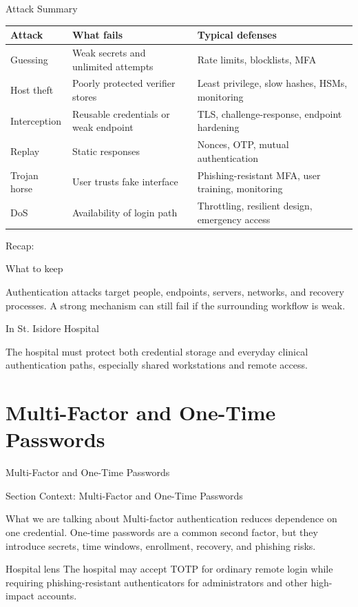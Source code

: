 \documentclass[presentation]{beamer}
\newcommand{\sectiontitleframe}[1]{
\begin{frame}[plain,c]
\begin{center}
{\usebeamerfont{title}\usebeamercolor[fg]{title}#1}
\end{center}
\end{frame}
}
\newcommand{\scenario}{St. Isidore Hospital}
\newcommand{\takeawaysframe}[2]{
  \begin{frame}[c]{Recap: \insertsection}
    \begin{block}{What to keep}
      #1
    \end{block}
    \begin{exampleblock}{In \scenario}
      #2
    \end{exampleblock}
  \end{frame}
}
\begin{document}
\begin{frame}[c]{Attack Summary}
  \small
  \begin{tabularx}{\textwidth}{@{}p{}p{}X@{}}
    \toprule
    \textbf{Attack} & \textbf{What fails} & \textbf{Typical defenses} \\
    \midrule
    Guessing & Weak secrets and unlimited attempts & Rate limits, blocklists, MFA \\
    Host theft & Poorly protected verifier stores & Least privilege, slow hashes, HSMs, monitoring \\
    Interception & Reusable credentials or weak endpoint & TLS, challenge-response, endpoint hardening \\
    Replay & Static responses & Nonces, OTP, mutual authentication \\
    Trojan horse & User trusts fake interface & Phishing-resistant MFA, user training, monitoring \\
    DoS & Availability of login path & Throttling, resilient design, emergency access \\
    \bottomrule
  \end{tabularx}
\end{frame}

\takeawaysframe{
  Authentication attacks target people, endpoints, servers, networks, and recovery processes. A strong mechanism can still fail if the surrounding workflow is weak.
}{
  The hospital must protect both credential storage and everyday clinical authentication paths, especially shared workstations and remote access.
}

\section{Multi-Factor and One-Time Passwords}
\sectiontitleframe{Multi-Factor and One-Time Passwords}

\begin{frame}[c]{Section Context: Multi-Factor and One-Time Passwords}
\begin{block}{What we are talking about}
Multi-factor authentication reduces dependence on one credential. One-time passwords are a common
second factor, but they introduce secrets, time windows, enrollment, recovery, and phishing risks.
\end{block}

\begin{exampleblock}{Hospital lens}
The hospital may accept TOTP for ordinary remote login while requiring phishing-resistant
authenticators for administrators and other high-impact accounts.
\end{exampleblock}
\end{frame}
\end{document}
